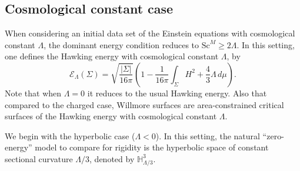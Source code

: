 \documentclass[12pt,a4paper]{amsart}
\theoremstyle{plain}
\theoremstyle{definition}
\begin{document}
\subsection{Cosmological constant case}


When considering an initial data set of the Einstein equations with cosmological constant $\Lambda $, the dominant energy condition reduces to $\mathrm{Sc}^M \geq 2 \Lambda $. In this setting, one defines the Hawking energy with cosmological constant $\Lambda$,  by   
\begin{equation} 
\mathcal{E}_{\Lambda}(\Sigma) = \sqrt{\frac{|\Sigma|}{16\pi}} 
\left( 
1   
- \frac{1}{16\pi} \int_{\Sigma} H^2+ \frac{4}{3} \Lambda \, d\mu 
\right).
\end{equation}
 Note that when \(\Lambda=0\) it reduces to the usual Hawking energy.  Also that compared to the charged case,  Willmore surfaces are area-constrained critical surfaces of the Hawking energy with cosmological constant $\Lambda$.



We begin with the hyperbolic case ($\Lambda < 0 $). In this setting, the natural “zero-energy” model to compare for rigidity is the  hyperbolic space of constant sectional curvature $\Lambda/3$, denoted by $\mathbb{H}^3_{\Lambda/3}$. 
\end{document}
